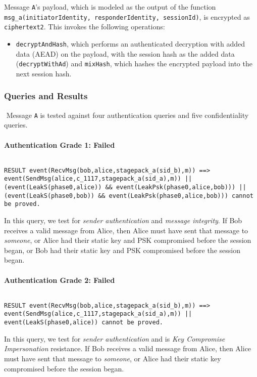 Message \texttt{A}'s payload, which is modeled as the output of the function \texttt{msg\_a(initiatorIdentity, responderIdentity, sessionId)}, is encrypted as \texttt{ciphertext2}. This invokes the following operations:


\begin{itemize}

\item \texttt{decryptAndHash}, which performs an authenticated decryption with added data (AEAD) on the payload, with the session hash as the added data (\texttt{decryptWithAd}) and \texttt{mixHash}, which hashes the encrypted payload into the next session hash.

\end{itemize}
\subsubsection{Queries and Results}$ $
Message \texttt{A} is tested against four authentication queries and five confidentiality queries.
\paragraph{Authentication Grade 1: Failed}$ $
\begin{lstlisting}
RESULT event(RecvMsg(bob,alice,stagepack_a(sid_b),m)) ==> event(SendMsg(alice,c_1117,stagepack_a(sid_a),m)) || (event(LeakS(phase0,alice)) && event(LeakPsk(phase0,alice,bob))) || (event(LeakS(phase0,bob)) && event(LeakPsk(phase0,alice,bob))) cannot be proved.
\end{lstlisting}

In this query, we test for \emph{sender authentication} and \emph{message integrity}. If Bob receives a valid message from Alice, then Alice must have sent that message to \emph{someone}, or Alice had their static key and PSK compromised before the session began, or Bob had their static key and PSK compromised before the session began.


\paragraph{Authentication Grade 2: Failed}$ $
\begin{lstlisting}
RESULT event(RecvMsg(bob,alice,stagepack_a(sid_b),m)) ==> event(SendMsg(alice,c_1117,stagepack_a(sid_a),m)) || event(LeakS(phase0,alice)) cannot be proved.
\end{lstlisting}

In this query, we test for \emph{sender authentication} and is \emph{Key Compromise Impersonation} resistance. If Bob receives a valid message from Alice, then Alice must have sent that message to \emph{someone}, or Alice had their static key compromised before the session began.


